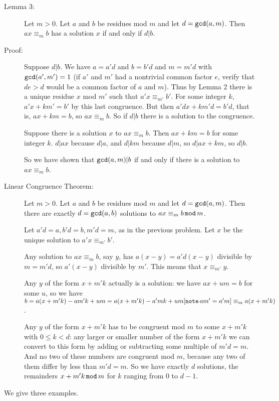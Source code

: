 \documentclass[12pt]{article}
\begin{document}
\begin{description}
\item[Lemma 3:]  Let $m>0$.  Let $a$ and $b$ be residues mod $m$ and let $d = {\tt gcd}(a,m)$.  Then $ax \equiv_m b$ has a solution $x$ if and only if
$d|b$.

\item[Proof:]  Suppose $d|b$.  We have $a=a'd$ and $b=b'd$ and $m=m'd$ with ${\tt gcd}(a',m')=1$ (if $a'$ and $m'$ had a nontrivial common factor $e$, verify that $de>d$ would be a common factor of $a$ and $m$).  Thus by Lemma 2 there is a unique residue $x$ mod $m'$ such that $a'x\equiv_{m'} b'$.  For some integer $k$,
$a'x +km' = b'$ by this last congruence.  But then $a'dx + km'd = b'd$, that is, $ax+km = b$, so $ax \equiv_m b$.  So if $d|b$ there is a solution to the congruence.

Suppose there is a solution $x$ to $ax \equiv_m b$.  Then $ax+km = b$ for some integer $k$.  $d|ax$ because $d|a$, and $d|km$ because $d|m$, so $d|ax+km$, so $d|b$.

So we have shown that ${\tt gcd}(a,m)|b$ if and only if there is a solution to $ax \equiv_m b$.

\item[Linear Congruence Theorem:]  Let $m>0$.  Let $a$ and $b$ be residues mod $m$ and let $d = {\tt gcd}(a,m)$.  Then there are exactly $d = {\tt gcd}(a,b)$ solutions to $ax \equiv_m b\,{\tt mod}\, m$.

Let $a'd = a, b'd = b, m'd=m$, as in the previous problem.  Let $x$ be the unique solution to $a'x \equiv_{m'} b'$.

Any solution to $ax \equiv_m b$, say $y$,  has $a(x-y) = a'd(x-y)$ divisible by $m=m'd$, so $a'(x-y)$ divisible by $m'$.  This means that $x \equiv_{m'} y$.

Any $y$ of the form $x+m'k$ actually is a solution:  we have $ax+um = b$ for some $u$, so we have $b=a(x+m'k)-am'k+um = a(x+m'k)-a'mk+um [{\tt note}\, am'=a'm]\equiv_m a(x+m'k)$.

Any $y$ of the form $x+m'k$ has to be congruent mod $m$ to some $x+m'k$ with $0 \leq k < d$:  any larger or smaller number of the form $x+m'k$ we can convert to this form by adding or subtracting some multiple of $m'd = m$.  And no two of these numbers are congruent mod $m$, because any two of them differ by less than $m'd=m$.  So we have exactly $d$ solutions, the remainders $x+m'k\,{\tt mod}\,m$ for $k$ ranging from 0 to $d-1$.

\end{description}

We give three examples.
\end{document}
